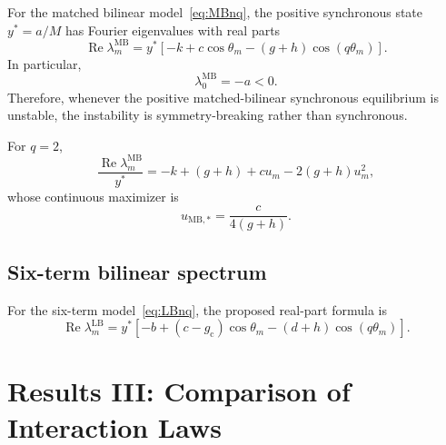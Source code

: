 \documentclass[11pt, reqno]{amsart}
\theoremstyle{definition}
\theoremstyle{remark}
\newcommand{\MB}{\mathrm{MB}}
\newcommand{\LB}{\mathrm{LB}}
\newcommand{\Ree}{\operatorname{Re}}
\begin{document}
For the matched bilinear model~\eqref{eq:MBnq}, the positive synchronous state
$y^*=a/M$ has Fourier eigenvalues with real parts
\begin{equation}
\label{eq:matched-bilinear-real}
    \Ree\lambda_m^{\MB}
    =
    y^*
    \left[
        -k+c\cos\theta_m-(g+h)\cos(q\theta_m)
    \right].
\end{equation}
In particular,
\begin{equation}
\label{eq:matched-bilinear-uniform}
    \lambda_0^{\MB}=-a<0.
\end{equation}
Therefore, whenever the positive matched-bilinear synchronous equilibrium is
unstable, the instability is symmetry-breaking rather than synchronous.

For $q=2$,
\begin{equation}
\label{eq:matched-bilinear-quadratic}
    \frac{\Ree\lambda_m^{\MB}}{y^*}
    =
    -k+(g+h)+c u_m-2(g+h)u_m^2,
\end{equation}
whose continuous maximizer is
\begin{equation}
\label{eq:bilinear-u-star}
    u_{\MB,*}=\frac{c}{4(g+h)}.
\end{equation}


\subsection{Six-term bilinear spectrum}

For the six-term model~\eqref{eq:LBnq}, the proposed real-part formula is
\begin{equation}
\label{eq:six-term-real}
    \Ree\lambda_m^{\LB}
    =
    y^*
    \left[
        -b+(c-g_{\mathrm c})\cos\theta_m-(d+h)\cos(q\theta_m)
    \right].
\end{equation}


\section{Results III: Comparison of Interaction Laws}
\label{sec:comparison}
\end{document}
